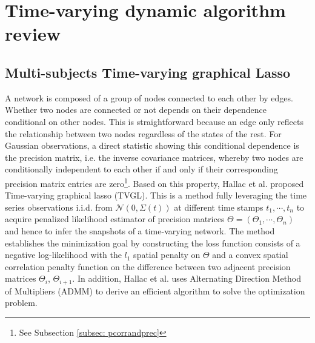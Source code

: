 \chapter{Time-varying dynamic algorithm review}

\section{Multi-subjects Time-varying graphical Lasso}

A network is composed of a group of nodes connected to each other by edges. 
Whether two nodes are connected or not depends on their dependence conditional on other nodes.
This is straightforward because an edge only reflects the relationship between two nodes regardless of the states of the rest. 
For Gaussian observations, a direct statistic showing this conditional dependence is the precision matrix, i.e. the inverse covariance matrices, 
whereby two nodes are conditionally independent to each other if and only if their corresponding precision matrix entries are zero\footnote{See Subsection \ref{subsec: pcorrandprec}}.
Based on this property, 
Hallac et al.\cite{hallac2017networkinferencetimevaryinggraphical} proposed Time-varying graphical lasso (TVGL).  
This is a method fully leveraging the time series observations i.i.d. from $\mathcal{N}(0,\Sigma(t))$ at different time stamps $t_1,\cdots,t_n$  
to acquire penalized likelihood estimator of precision matrices $\Theta=(\Theta_1, \cdots, \Theta_n)$
and hence to infer the snapshots of a time-varying network.
The method establishes the minimization goal by constructing the loss function consists of a negative log-likelihood with 
the $l_1$ spatial penalty on $\Theta$ and a convex spatial correlation penalty function on the difference between two adjacent precision matrices $\Theta_i$, $\Theta_{i+1}$. 
In addition, Hallac et al.\cite{hallac2017networkinferencetimevaryinggraphical} uses Alternating Direction Method of
Multipliers (ADMM) to derive an efficient algorithm to solve the optimization problem. 


